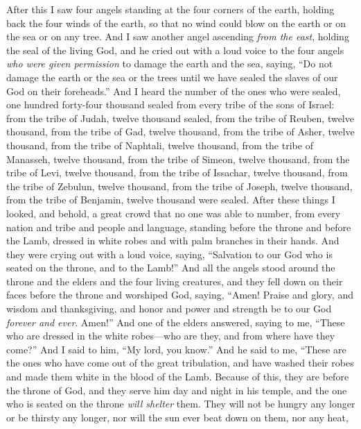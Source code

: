\begin{biblechapter} %
 After this I saw four angels standing at the four corners of the earth, holding back the four winds of the earth, so that no wind could blow on the earth or on the sea or on any tree.
\verse And I saw another angel ascending \textit{from the east}, holding the seal of the living God, and he cried out with a loud voice to the four angels \textit{who were given permission} to damage the earth and the sea,
\verse saying, “Do not damage the earth or the sea or the trees until we have sealed the slaves of our God on their foreheads.”
\verse And I heard the number of the ones who were sealed, one hundred forty-four thousand sealed from every tribe of the sons of Israel:
\verse from the tribe of Judah, twelve thousand sealed, from the tribe of Reuben, twelve thousand, from the tribe of Gad, twelve thousand,
\verse from the tribe of Asher, twelve thousand, from the tribe of Naphtali, twelve thousand, from the tribe of Manasseh, twelve thousand,
\verse from the tribe of Simeon, twelve thousand, from the tribe of Levi, twelve thousand, from the tribe of Issachar, twelve thousand,
\verse from the tribe of Zebulun, twelve thousand, from the tribe of Joseph, twelve thousand, from the tribe of Benjamin, twelve thousand were sealed.
 After these things I looked, and behold, a great crowd that no one was able to number, from every nation and tribe and people and language, standing before the throne and before the Lamb, dressed in white robes and with palm branches in their hands.
\verse And they were crying out with a loud voice, saying, “Salvation to our God 
who is seated on the throne, 
and to the Lamb!”
\verse And all the angels stood around the throne and the elders and the four living creatures, and they fell down on their faces before the throne and worshiped God,
\verse saying, “Amen! Praise and glory, 
and wisdom and thanksgiving, 
and honor and power and strength 
be to our God \textit{forever and ever}. Amen!”
\verse And one of the elders answered, saying to me, “These who are dressed in the white robes—who are they, and from where have they come?”
\verse And I said to him, “My lord, you know.” And he said to me,
\verse “These are the ones who have come out of the great tribulation, 
and have washed their robes 
and made them white in the blood of the Lamb.
\verse Because of this, they are before the throne of God, 
and they serve him day and night in his temple, 
and the one who is seated on the throne \textit{will shelter} them.
\verse They will not be hungry any longer or be thirsty any longer, 
nor will the sun ever beat down on them, nor any heat,
\end{biblechapter}

